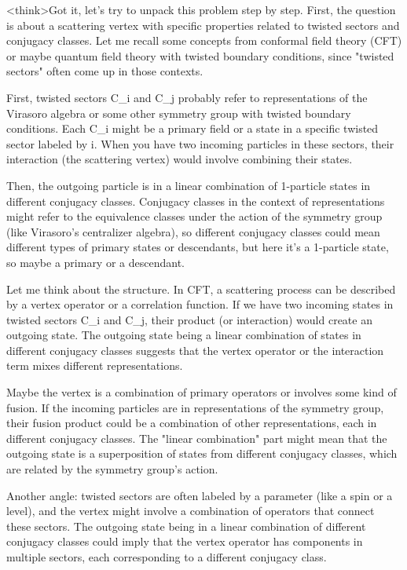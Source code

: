 <think>Got it, let's try to unpack this problem step by step. First, the question is about a scattering vertex with specific properties related to twisted sectors and conjugacy classes. Let me recall some concepts from conformal field theory (CFT) or maybe quantum field theory with twisted boundary conditions, since "twisted sectors" often come up in those contexts.

First, twisted sectors C_i and C_j probably refer to representations of the Virasoro algebra or some other symmetry group with twisted boundary conditions. Each C_i might be a primary field or a state in a specific twisted sector labeled by i. When you have two incoming particles in these sectors, their interaction (the scattering vertex) would involve combining their states.

Then, the outgoing particle is in a linear combination of 1-particle states in different conjugacy classes. Conjugacy classes in the context of representations might refer to the equivalence classes under the action of the symmetry group (like Virasoro's centralizer algebra), so different conjugacy classes could mean different types of primary states or descendants, but here it's a 1-particle state, so maybe a primary or a descendant.

Let me think about the structure. In CFT, a scattering process can be described by a vertex operator or a correlation function. If we have two incoming states in twisted sectors C_i and C_j, their product (or interaction) would create an outgoing state. The outgoing state being a linear combination of states in different conjugacy classes suggests that the vertex operator or the interaction term mixes different representations.

Maybe the vertex is a combination of primary operators or involves some kind of fusion. If the incoming particles are in representations of the symmetry group, their fusion product could be a combination of other representations, each in different conjugacy classes. The "linear combination" part might mean that the outgoing state is a superposition of states from different conjugacy classes, which are related by the symmetry group's action.

Another angle: twisted sectors are often labeled by a parameter (like a spin or a level), and the vertex might involve a combination of operators that connect these sectors. The outgoing state being in a linear combination of different conjugacy classes could imply that the vertex operator has components in multiple sectors, each corresponding to a different conjugacy class.

